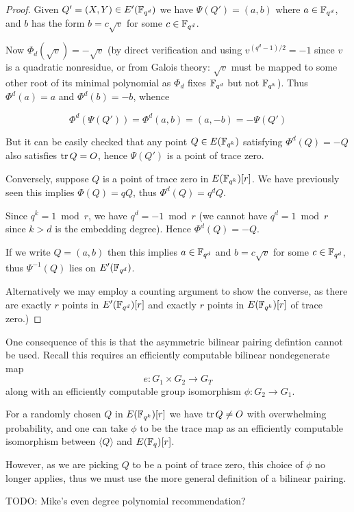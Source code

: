 \begin{proof}
Given $Q' = (X,Y) \in E'(\mathbb{F}_{q^d})$ we have $\Psi(Q') = (a, b)$
where $a \in \mathbb{F}_{q^d}$, and $b$ has the form $b = c \sqrt{v}$ for some
$c \in \mathbb{F}_{q^d}$.

Now $\Phi_d(\sqrt{v}) = -\sqrt{v}$ (by direct verification and using
$v^{(q^d - 1)/2} = -1$ since $v$ is a quadratic nonresidue, or
from Galois theory: $\sqrt{v}$ must
be mapped to some other root of its minimal polynomial as $\Phi_d$ fixes
$\mathbb{F}_{q^d}$ but not $\mathbb{F}_{q^k}$).
Thus $\Phi^d(a) = a$ and $\Phi^d(b) = -b$, whence

\[ \Phi^d(\Psi(Q')) = \Phi^d(a,b) = (a, -b) = -\Psi(Q') \]

But it can be easily checked that
any point $Q \in E(\mathbb{F}_{q^k})$ satisfying $\Phi^d(Q) = -Q$ also satisfies
$\mathop{\rm tr} Q = O$, hence $\Psi(Q')$ is a point of trace zero.

Conversely, suppose $Q$ is a point of trace zero in $E(\mathbb{F}_{q^k})[r]$.
We have previously seen this implies $\Phi(Q) = q Q$,
thus $\Phi^d(Q) = q^d Q$.

Since $q^k = 1 \bmod r$, we have $q^d = -1 \bmod r$ (we cannot
have $q^d = 1 \bmod r$ since $k > d$ is the embedding degree).
Hence $\Phi^d(Q) = -Q$.

If we write $Q=(a,b)$ then this implies $a \in \mathbb{F}_{q^d}$ and $b = c \sqrt{v}$
for some $c \in \mathbb{F}_{q^d}$, thus $\Psi^{-1}(Q)$ lies on $E'(\mathbb{F}_{q^d})$.

Alternatively we may employ a counting argument to show the converse,
as there are exactly
$r$ points in $E'(\mathbb{F}_{q^d})[r]$ and exactly $r$ points in $E(\mathbb{F}_{q^k})[r]$ of trace
zero.)
\end{proof}

One consequence of this is that the asymmetric bilinear pairing defintion
cannot be used. Recall this requires an efficiently
computable bilinear nondegenerate map
\[
e:G_1 \times G_2 \rightarrow G_T
\]
along with an efficiently computable group isomorphism
$\phi : G_2 \rightarrow G_1$.

For a randomly chosen $Q$ in $E(\mathbb{F}_{q^k})[r]$ we have $\mathop{\rm tr} Q \ne O$ with
overwhelming probability, and one can take $\phi$ to be the trace map
as an efficiently computable isomorphism between $\langle Q \rangle$
and $E(\mathbb{F}_q)[r]$.

However, as we are picking $Q$ to be a point of trace zero, this choice
of $\phi$ no longer applies, thus we must use the more general definition
of a bilinear pairing.

TODO: Mike's even degree polynomial recommendation?

